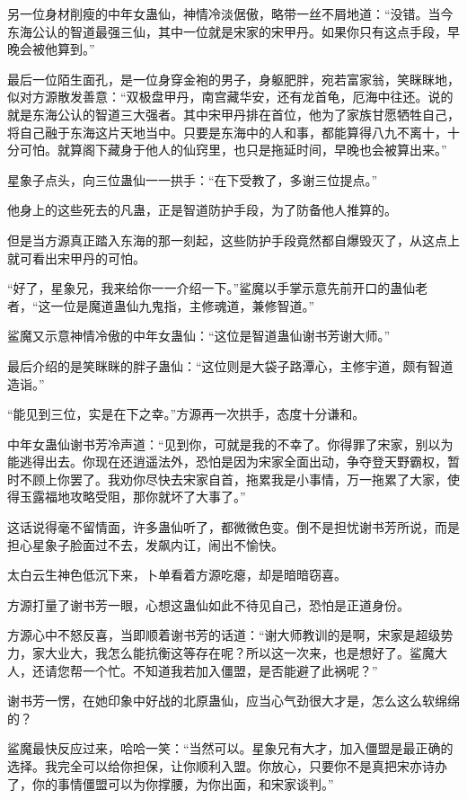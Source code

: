 \begin{this_body}
另一位身材削瘦的中年女蛊仙，神情冷淡倨傲，略带一丝不屑地道：“没错。当今东海公认的智道最强三仙，其中一位就是宋家的宋甲丹。如果你只有这点手段，早晚会被他算到。”

最后一位陌生面孔，是一位身穿金袍的男子，身躯肥胖，宛若富家翁，笑眯眯地，似对方源散发善意：“双极盘甲丹，南宫藏华安，还有龙首龟，厄海中往还。说的就是东海公认的智道三大强者。其中宋甲丹排在首位，他为了家族甘愿牺牲自己，将自己融于东海这片天地当中。只要是东海中的人和事，都能算得八九不离十，十分可怕。就算阁下藏身于他人的仙窍里，也只是拖延时间，早晚也会被算出来。”

星象子点头，向三位蛊仙一一拱手：“在下受教了，多谢三位提点。”

他身上的这些死去的凡蛊，正是智道防护手段，为了防备他人推算的。

但是当方源真正踏入东海的那一刻起，这些防护手段竟然都自爆毁灭了，从这点上就可看出宋甲丹的可怕。

“好了，星象兄，我来给你一一介绍一下。”鲨魔以手掌示意先前开口的蛊仙老者，“这一位是魔道蛊仙九鬼指，主修魂道，兼修智道。”

鲨魔又示意神情冷傲的中年女蛊仙：“这位是智道蛊仙谢书芳谢大师。”

最后介绍的是笑眯眯的胖子蛊仙：“这位则是大袋子路潭心，主修宇道，颇有智道造诣。”

“能见到三位，实是在下之幸。”方源再一次拱手，态度十分谦和。

中年女蛊仙谢书芳冷声道：“见到你，可就是我的不幸了。你得罪了宋家，别以为能逃得出去。你现在还逍遥法外，恐怕是因为宋家全面出动，争夺登天野霸权，暂时不顾上你罢了。我劝你尽快去宋家自首，拖累我是小事情，万一拖累了大家，使得玉露福地攻略受阻，那你就坏了大事了。”

这话说得毫不留情面，许多蛊仙听了，都微微色变。倒不是担忧谢书芳所说，而是担心星象子脸面过不去，发飙内讧，闹出不愉快。

太白云生神色低沉下来，卜单看着方源吃瘪，却是暗暗窃喜。

方源打量了谢书芳一眼，心想这蛊仙如此不待见自己，恐怕是正道身份。

方源心中不怒反喜，当即顺着谢书芳的话道：“谢大师教训的是啊，宋家是超级势力，家大业大，我怎么能抗衡这等存在呢？所以这一次来，也是想好了。鲨魔大人，还请您帮一个忙。不知道我若加入僵盟，是否能避了此祸呢？”

谢书芳一愣，在她印象中好战的北原蛊仙，应当心气劲很大才是，怎么这么软绵绵的？

鲨魔最快反应过来，哈哈一笑：“当然可以。星象兄有大才，加入僵盟是最正确的选择。我完全可以给你担保，让你顺利入盟。你放心，只要你不是真把宋亦诗办了，你的事情僵盟可以为你撑腰，为你出面，和宋家谈判。”


\end{this_body}
